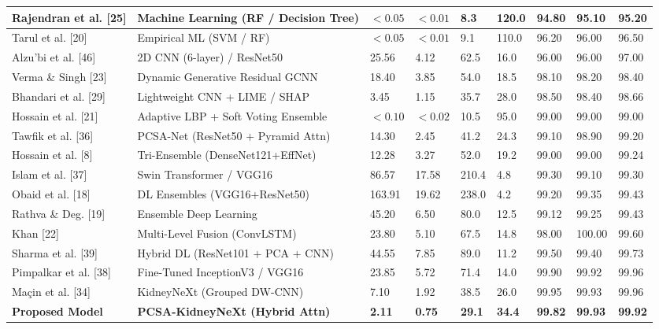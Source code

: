 \begin{longtable}{|L{2.35cm}|L{3.2cm}|C{1.1cm}|C{1.0cm}|C{1.15cm}|C{1.65cm}|C{1.35cm}|C{1.15cm}|C{1.35cm}|}
Rajendran et al. [25] & Machine Learning (RF / Decision Tree) & $<0.05$ & $<0.01$ & 8.3 & 120.0 & 94.80 & 95.10 & 95.20 \\
\hline
Tarul et al. [20] & Empirical ML (SVM / RF) & $<0.05$ & $<0.01$ & 9.1 & 110.0 & 96.20 & 96.00 & 96.50 \\
\hline
Alzu'bi et al. [46] & 2D CNN (6-layer) / ResNet50 & 25.56 & 4.12 & 62.5 & 16.0 & 96.00 & 96.00 & 97.00 \\
\hline
Verma \& Singh [23] & Dynamic Generative Residual GCNN & 18.40 & 3.85 & 54.0 & 18.5 & 98.10 & 98.20 & 98.40 \\
\hline
Bhandari et al. [29] & Lightweight CNN + LIME / SHAP & 3.45 & 1.15 & 35.7 & 28.0 & 98.50 & 98.40 & 98.66 \\
\hline
Hossain et al. [21] & Adaptive LBP + Soft Voting Ensemble & $<0.10$ & $<0.02$ & 10.5 & 95.0 & 99.00 & 99.00 & 99.00 \\
\hline
Tawfik et al. [36] & PCSA-Net (ResNet50 + Pyramid Attn) & 14.30 & 2.45 & 41.2 & 24.3 & 99.10 & 98.90 & 99.20 \\
\hline
Hossain et al. [8] & Tri-Ensemble (DenseNet121+EffNet) & 12.28 & 3.27 & 52.0 & 19.2 & 99.00 & 99.00 & 99.24 \\
\hline
Islam et al. [37] & Swin Transformer / VGG16 & 86.57 & 17.58 & 210.4 & 4.8 & 99.30 & 99.10 & 99.30 \\
\hline
Obaid et al. [18] & DL Ensembles (VGG16+ResNet50) & 163.91 & 19.62 & 238.0 & 4.2 & 99.20 & 99.35 & 99.43 \\
\hline
Rathva \& Deg. [19] & Ensemble Deep Learning & 45.20 & 6.50 & 80.0 & 12.5 & 99.12 & 99.25 & 99.43 \\
\hline
Khan [22] & Multi-Level Fusion (ConvLSTM) & 23.80 & 5.10 & 67.5 & 14.8 & 98.00 & 100.00 & 99.60 \\
\hline
Sharma et al. [39] & Hybrid DL (ResNet101 + PCA + CNN) & 44.55 & 7.85 & 89.0 & 11.2 & 99.50 & 99.40 & 99.73 \\
\hline
Pimpalkar et al. [38] & Fine-Tuned InceptionV3 / VGG16 & 23.85 & 5.72 & 71.4 & 14.0 & 99.90 & 99.92 & 99.96 \\
\hline
Maçin et al. [34] & KidneyNeXt (Grouped DW-CNN) & 7.10 & 1.92 & 38.5 & 26.0 & 99.95 & 99.93 & 99.96 \\
\hline
\textbf{Proposed Model} & \textbf{PCSA-KidneyNeXt (Hybrid Attn)} & \textbf{2.11} & \textbf{0.75} & \textbf{29.1} & \textbf{34.4} & \textbf{99.82} & \textbf{99.93} & \textbf{99.92} \\
\hline
\end{longtable}

